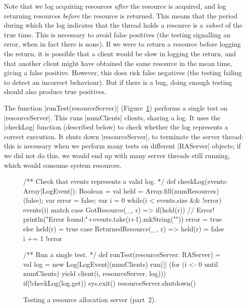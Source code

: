 Note that we log acquiring resources \emph{after} the resource is acquired,
and log returning resources \emph{before} the resource is returned.  This
means that the period during which the log indicates that the thread holds a
resource is a \emph{subset} of the true time.
%
This is necessary to avoid false positives (the testing signalling an error,
when in fact there is none).  If we were to return a resource before logging
the return, it is possible that a client would be slow in logging the return,
and that another client might have obtained the same resource in the mean
time, giving a false positive.
%
However, this does risk false negatives (the testing failing to detect an
incorrect behaviour).  But if there is a bug, doing enough testing should also
produce true positives. 

The function |runTest(resourceServer)| (Figure~\ref{fig:RATest-2}) performs a
single test on |resourceServer|.  This runs |numClients| clients, sharing a
log.  It uses the |checkLog| function (described below) to check whether the
log represents a correct execution.  It shuts down |resourceServer|, to
terminate the server thread: this is necessary when we perform many tests on
different |RAServer| objects; if we did not do this, we would end up with many
server threads still running, which would consume system resources.


\begin{figure}
\begin{scala}
  /** Check that events represents a valid log.  */
  def checkLog(events: Array[LogEvent]): Boolean = {
    val held = Array.fill(numResources)(false); var error = false; var i = 0
    while(i < events.size && !error){
      events(i) match{
        case GotResource(_, r) =>
          if(held(r)){ // Error!
            println("Error found:\n"+events.take(i+1).mkString("\n"))
            error = true
          }
          else held(r) = true
        case ReturnedResource(_, r) => held(r) = false
      }
      i += 1
    }
    !error
  }

  /** Run a single test. */
  def runTest(resourceServer: RAServer) = {
    val log = new Log[LogEvent](numClients)
    run(|| (for (i <- 0 until numClients) yield client(i, resourceServer, log)))
    if(!checkLog(log.get)) sys.exit()
    resourceServer.shutdown()
  }
\end{scala}
\caption{Testing a resource allocation server (part~2).}
\label{fig:RATest-2}
\end{figure}

